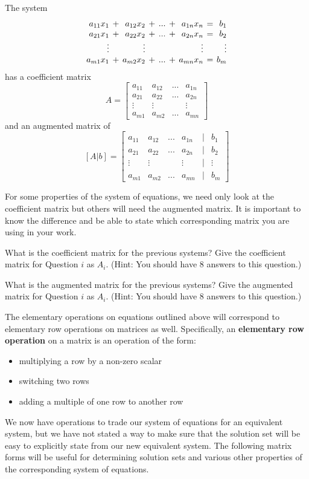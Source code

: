 The system
\begin{equation*}
\setlength{\arraycolsep}{2pt}
\begin{array}{rcrcrcrcr}
  a_{11} x_1  &+& a_{12} x_2 &+& ... &+&  a_{1n}x_n &=& b_1 \\ %
  a_{21} x_1  &+& a_{22} x_2 &+& ... &+&  a_{2n}x_n &=& b_2 \\
  \vdots  & & \vdots & &  & &  \vdots && \vdots \\
  a_{m1} x_1  &+& a_{m2} x_2 &+& ... &+&  a_{mn}x_n &=& b_m
\end{array}
\end{equation*}
has a coefficient matrix
$$A=\begin{bmatrix} a_{11} & a_{12} & ... &  a_{1n} \\
  a_{21}& a_{22}& ... &  a_{2n} \\
  \vdots  & \vdots &   &  \vdots   \\
  a_{m1}& a_{m2} & ... &  a_{mn}  \end{bmatrix}$$
and an augmented matrix of
$$[A|b]=\begin{bmatrix} a_{11} & a_{12} & ... &  a_{1n} &|&b_1\\
  a_{21}& a_{22}& ... &  a_{2n} &|&b_2\\
  \vdots  & \vdots &   &  \vdots &|& \vdots  \\
  a_{m1}& a_{m2} & ... &  a_{mn} &|&b_m \end{bmatrix}$$

For some properties of the system of equations, we need only look at the coefficient matrix but others will need the augmented matrix. It is important to know the difference and be able to state which corresponding matrix you are using in your work.

\begin{question} What is the coefficient matrix for the previous systems? Give the coefficient matrix for Question $i$ as $A_i$. (Hint: You should have 8 answers to this question.)
\end{question}

\begin{question} What is the augmented matrix for the previous systems? Give the augmented matrix for Question $i$ as $A_i$. (Hint: You should have 8 answers to this question.)
\end{question}

The elementary operations on equations outlined above will correspond to elementary row operations on matrices as well. Specifically,
an \textbf{elementary row operation} on a matrix is an operation of the form:
\begin{itemize}
\item multiplying a row by a non-zero scalar
\item switching two rows
\item adding a multiple of one row to another row
\end{itemize}
We now have operations to trade our system of equations for an equivalent system, but we have not stated a way to make sure that the solution set will be easy to explicitly state from our new equivalent system. The following matrix forms will be useful for determining solution sets and various other properties of the corresponding system of equations.

